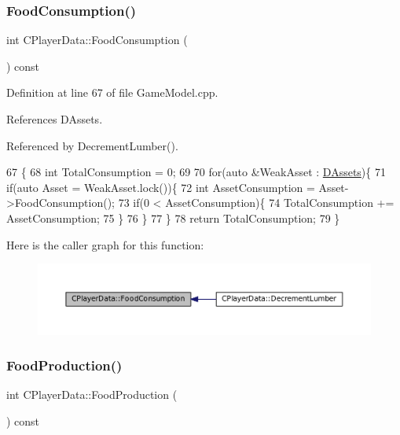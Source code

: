 \subsubsection{\texorpdfstring{Food\+Consumption()}{FoodConsumption()}}
{\footnotesize\ttfamily int C\+Player\+Data\+::\+Food\+Consumption (\begin{DoxyParamCaption}{ }\end{DoxyParamCaption}) const}



Definition at line 67 of file Game\+Model.\+cpp.



References D\+Assets.



Referenced by Decrement\+Lumber().


\begin{DoxyCode}
67                                       \{
68     \textcolor{keywordtype}{int} TotalConsumption = 0;
69     
70     \textcolor{keywordflow}{for}(\textcolor{keyword}{auto} &WeakAsset : \hyperlink{classCPlayerData_a1d7dd355facf52db6242e3554373906c}{DAssets})\{
71         \textcolor{keywordflow}{if}(\textcolor{keyword}{auto} Asset = WeakAsset.lock())\{
72             \textcolor{keywordtype}{int} AssetConsumption = Asset->FoodConsumption();
73             \textcolor{keywordflow}{if}(0 < AssetConsumption)\{
74                 TotalConsumption += AssetConsumption;    
75             \}
76         \}
77     \}
78     \textcolor{keywordflow}{return} TotalConsumption;
79 \}
\end{DoxyCode}
Here is the caller graph for this function\+:\nopagebreak
\begin{figure}[H]
\begin{center}
\leavevmode
\includegraphics[width=350pt]{classCPlayerData_a45b5ba15a17796acdbaca7eacc7532d0_icgraph}
\end{center}
\end{figure}
\hypertarget{classCPlayerData_ae71ad19439d31ba0eb7f59809885ed6d}{}\label{classCPlayerData_ae71ad19439d31ba0eb7f59809885ed6d} 
\subsubsection{\texorpdfstring{Food\+Production()}{FoodProduction()}}
{\footnotesize\ttfamily int C\+Player\+Data\+::\+Food\+Production (\begin{DoxyParamCaption}{ }\end{DoxyParamCaption}) const}




